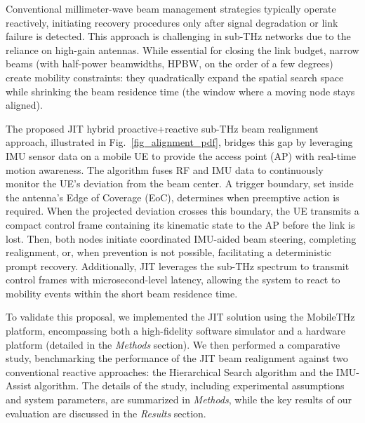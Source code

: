 \documentclass[fleqn,10pt]{wlscirep}
\begin{document}
Conventional millimeter-wave beam management strategies typically operate reactively, initiating recovery procedures only after signal degradation or link failure is detected\cite{Giordani2018ATO, Wang2022}. This approach is challenging in sub-THz networks due to the reliance on high-gain antennas\cite{Kleine-Ostmann2011}. While essential for closing the link budget, narrow beams (with half-power beamwidths, HPBW, on the order of a few degrees) create mobility constraints: they quadratically expand the spatial search space while shrinking the beam residence time (the window where a moving node stays aligned).

The proposed JIT hybrid proactive+reactive sub-THz beam realignment approach, illustrated in Fig.~\ref{fig_alignment_pdf}, bridges this gap by leveraging IMU sensor data on a mobile UE to provide the access point (AP) with real-time motion awareness. The algorithm fuses RF and IMU data to continuously monitor the UE's deviation from the beam center. A trigger boundary, set inside the antenna's Edge of Coverage (EoC), determines when preemptive action is required. When the projected deviation crosses this boundary, the UE transmits a compact control frame containing its kinematic state to the AP before the link is lost. Then, both nodes initiate coordinated IMU-aided beam steering, completing realignment, or, when prevention is not possible, facilitating a deterministic prompt recovery. Additionally, JIT leverages the sub-THz spectrum to transmit control frames with microsecond-level latency, allowing the system to react to mobility events within the short beam residence time.

To validate this proposal, we implemented the JIT solution using the MobileTHz platform, encompassing both a high-fidelity software simulator and a hardware platform (detailed in the \textit{Methods} section). We then performed a comparative study, benchmarking the performance of the JIT beam realignment against two conventional reactive approaches: the Hierarchical Search algorithm and the IMU-Assist algorithm. The details of the study, including experimental assumptions and system parameters, are summarized in \textit{Methods}, while the key results of our evaluation are discussed in the \textit{Results} section.



\end{document}
